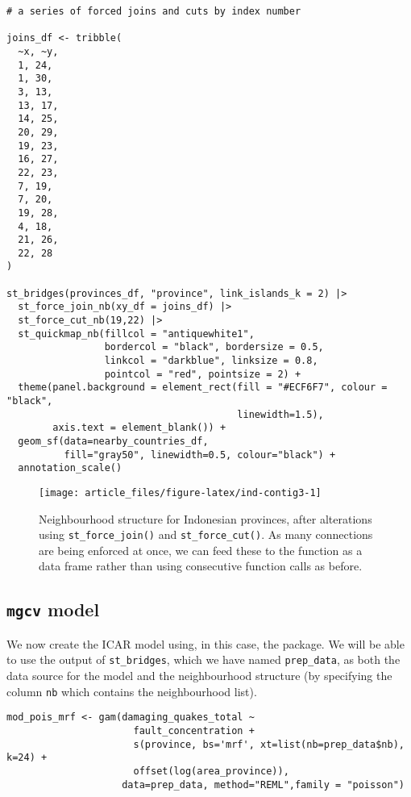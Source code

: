 \begin{verbatim}
# a series of forced joins and cuts by index number

joins_df <- tribble(
  ~x, ~y,
  1, 24,
  1, 30,
  3, 13,
  13, 17,
  14, 25,
  20, 29,
  19, 23,
  16, 27,
  22, 23,
  7, 19,
  7, 20,
  19, 28,
  4, 18,
  21, 26,
  22, 28
)

st_bridges(provinces_df, "province", link_islands_k = 2) |>
  st_force_join_nb(xy_df = joins_df) |>
  st_force_cut_nb(19,22) |>
  st_quickmap_nb(fillcol = "antiquewhite1",
                 bordercol = "black", bordersize = 0.5,
                 linkcol = "darkblue", linksize = 0.8,
                 pointcol = "red", pointsize = 2) +
  theme(panel.background = element_rect(fill = "#ECF6F7", colour = "black",
                                        linewidth=1.5),
        axis.text = element_blank()) +
  geom_sf(data=nearby_countries_df,
          fill="gray50", linewidth=0.5, colour="black") +
  annotation_scale()
\end{verbatim}

\begin{figure}

{\centering \texttt{[image: article\_files/figure-latex/ind-contig3-1]} 

}

\caption{Neighbourhood structure for Indonesian provinces, after alterations using \texttt{st\_force\_join()} and \texttt{st\_force\_cut()}. As many connections are being enforced at once, we can feed these to the function as a data frame rather than using consecutive function calls as before.}\label{fig:ind-contig3}
\end{figure}

\subsection{\texorpdfstring{\texttt{mgcv} model}{mgcv model}}\label{mgcv-model}

We now create the ICAR model using, in this case, the  package. We will be able to use the output of \texttt{st\_bridges}, which we have named \texttt{prep\_data}, as both the data source for the model and the neighbourhood structure (by specifying the column \texttt{nb} which contains the neighbourhood list).

\begin{verbatim}
mod_pois_mrf <- gam(damaging_quakes_total ~
                      fault_concentration +
                      s(province, bs='mrf', xt=list(nb=prep_data$nb), k=24) +
                      offset(log(area_province)),
                    data=prep_data, method="REML",family = "poisson")
\end{verbatim}

